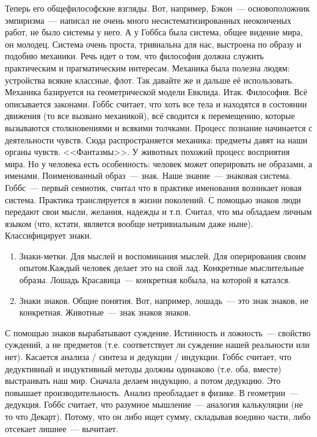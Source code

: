 Теперь его общефилософские взгляды.
Вот, например, Бэкон~--- основоположник эмпиризма~--- написал не очень много несистематизированных неоконченых работ, не было системы у него. А у Гоббса была система, общее видение мира, он молодец. Система очень проста, тривиальна для нас, выстроена по образу и подобию механики. Речь идет о том, что философия должна служить практическим и прагматическим интересам. Механика была полезна людям: устройства всякие классные, флот. Так давайте же и дальше её использовать. Механика базируется на геометрической модели Евклида. Итак. Философия. Всё описывается законами. Гоббс считает, что хоть все тела и находятся в состоянии движения (то все вызвано механикой), всё сводится к перемещению, которые вызываются столкновениями и всякими толчками. Процесс познание начинается с деятельности чувств. Сюда распространяется механика: предметы давят на наши органы чувств. <<Фантазмы>>. У животных похожий процесс восприятия мира. Но у человека есть особенность: человек может оперировать не образами, а именами. Поименованный образ~--- знак. Наше знание~--- знаковая система. Гоббс~--- первый семиотик, считал что в практике именования возникает новая система. Практика транслируется в жизни поколений. С помощью знаков люди передают свои мысли, желания, надежды и т.п. Считал, что мы обладаем личным языком (что, кстати, является вообще нетривиальным даже ныне). Классифицирует знаки.
\begin{enumerate}
	\item Знаки-метки. Для мыслей и воспоминания мыслей. Для оперирования своим опытом.Каждый человек делает это на свой лад. Конкретные мыслительные образы. Лошадь Красавица~--- конкретная кобыла, на которой я катался.
	\item Знаки знаков. Общие понятия. Вот, например, лошадь~--- это знак знаков, не конкретная. Животные~--- знак знаков знаков.
\end{enumerate}
	
С помощью знаков вырабатывают суждение. Истинность и ложность~--- свойство суждений, а не предметов (т.е. соответствует ли суждение нашей реальности или нет).
Касается анализа / синтеза и дедукции / индукции. Гоббс считает, что дедуктивный и индуктивный методы должны одинаково (т.е. оба, вместе) выстраивать наш мир. Сначала делаем индукцию, а потом дедукцию. Это повышает производительность. Анализ преобладает в физике. В геометрии~--- дедукция. Гоббс считает, что разумное мышление~--- аналогия калькуляции (не то что Декарт). Потому, что он либо ищет сумму, складывая воедино части, либо отсекает лишнее~--- вычитает.

